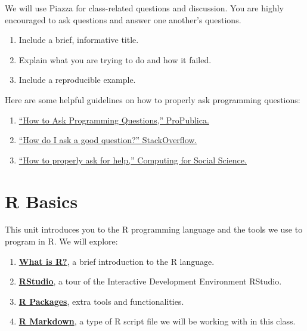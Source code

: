 \documentclass[
]{book}
\providecommand{\tightlist}{%
  \setlength{\itemsep}{0pt}\setlength{\parskip}{0pt}}
\begin{document}
We will use Piazza for class-related questions and discussion. You are highly encouraged to ask questions and answer one another's questions.

\begin{enumerate}
\def\labelenumi{\arabic{enumi}.}
\tightlist
\item
  Include a brief, informative title.
\item
  Explain what you are trying to do and how it failed.
\item
  Include a reproducible example.
\end{enumerate}

Here are some helpful guidelines on how to properly ask programming questions:

\begin{enumerate}
\def\labelenumi{\arabic{enumi}.}
\tightlist
\item
  \href{https://www.propublica.org/nerds/how-to-ask-programming-questions}{``How to Ask Programming Questions,'' ProPublica.}
\item
  \href{https://stackoverflow.com/help/how-to-ask}{``How do I ask a good question?'' StackOverflow.}
\item
  \href{https://cfss.uchicago.edu/faq/asking-questions/}{``How to properly ask for help,'' Computing for Social Science.}
\end{enumerate}

\hypertarget{r-basics}{%
\chapter{R Basics}\label{r-basics}}

This unit introduces you to the R programming language and the tools we use to program in R. We will explore:

\begin{enumerate}
\def\labelenumi{\arabic{enumi}.}
\tightlist
\item
  \textbf{\protect\hyperlink{what-is-r}{What is R?}}, a brief introduction to the R language.
\item
  \textbf{\protect\hyperlink{rstudio-1}{RStudio}}, a tour of the Interactive Development Environment RStudio.
\item
  \textbf{\protect\hyperlink{r-packages-1}{R Packages}}, extra tools and functionalities.
\item
  \textbf{\protect\hyperlink{r-markdown}{R Markdown}}, a type of R script file we will be working with in this class.
\end{enumerate}
\end{document}
